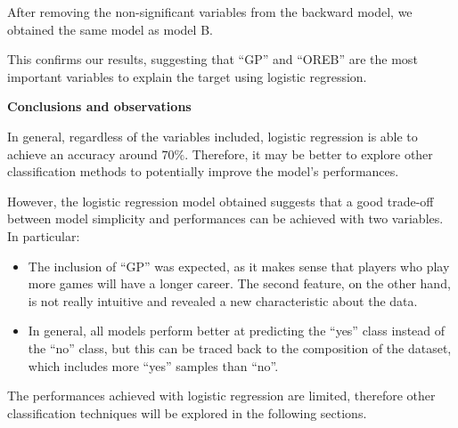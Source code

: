 After removing the non-significant variables from the backward model, we obtained the same model as model B. 

This confirms our results, suggesting that ``GP'' and ``OREB'' are the most important variables to explain the target using logistic regression. 

\vspace{0.2cm}
\noindent
\textbf{Conclusions and observations}

In general, regardless of the variables included, logistic regression is able to achieve an accuracy around $70\%$. Therefore, it may be better to explore other classification methods to potentially improve the model's performances.

However, the logistic regression model obtained suggests that a good trade-off between model simplicity and performances can be achieved with two variables. In particular:

\begin{itemize}
	\item The inclusion of ``GP'' was expected, as it makes sense that players who play more games will have a longer career. The second feature, on the other hand, is not really intuitive and revealed a new characteristic about the data.
	\item In general, all models perform better at predicting the ``yes'' class instead of the ``no'' class, but this can be traced back to the composition of the dataset, which includes more ``yes'' samples than ``no''.
\end{itemize}

The performances achieved with logistic regression are limited, therefore other classification techniques will be explored in the following sections.
